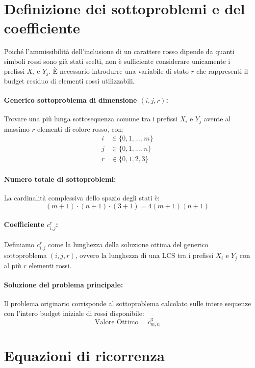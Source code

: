\section{Definizione dei sottoproblemi e del coefficiente}

Poiché l'ammissibilità dell'inclusione di un carattere rosso dipende da quanti simboli rossi sono già stati scelti, non è sufficiente considerare unicamente i prefissi $X_i$ e $Y_j$. È necessario introdurre una variabile di stato $r$ che rappresenti il budget residuo di elementi rossi utilizzabili.

\paragraph{Generico sottoproblema di dimensione $(i, j, r)$:}
Trovare una più lunga sottosequenza comune tra i prefissi $X_i$ e $Y_j$ avente al massimo $r$ elementi di colore rosso, con:
\begin{align*}
    i &\in \{0, 1, \dots, m\} \\
    j &\in \{0, 1, \dots, n\} \\
    r &\in \{0, 1, 2, 3\}
\end{align*}

\paragraph{Numero totale di sottoproblemi:}
La cardinalità complessiva dello spazio degli stati è:
\[
(m + 1) \cdot (n + 1) \cdot (3 + 1) = 4(m + 1)(n + 1)
\]

\paragraph{Coefficiente $c_{i,j}^r$:}
Definiamo $c_{i,j}^r$ come la lunghezza della soluzione ottima del generico sottoproblema $(i, j, r)$, ovvero la lunghezza di una LCS tra i prefissi $X_i$ e $Y_j$ con al più $r$ elementi rossi.

\paragraph{Soluzione del problema principale:}
Il problema originario corrisponde al sottoproblema calcolato sulle intere sequenze con l'intero budget iniziale di rossi disponibile:
\[
\text{Valore Ottimo} = c_{m, n}^3
\]

\section{Equazioni di ricorrenza}

